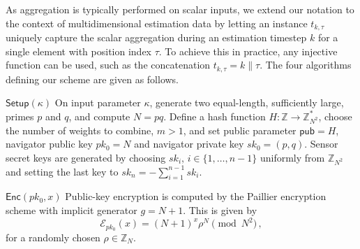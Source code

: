 \documentclass[10pt,letterpaper,oneside,twocolumn,journal]{IEEEtran}
\theoremstyle{definition}
\theoremstyle{definition}
\theoremstyle{remark}
\begin{document}
As aggregation is typically performed on scalar inputs, we extend our notation to the context of multidimensional estimation data by letting an instance $t_{k,\tau}$ uniquely capture the scalar aggregation during an estimation timestep $k$ for a single element with position index $\tau$. To achieve this in practice, any injective function can be used, such as the concatenation $t_{k,\tau}=k\mathbin\|\tau$. The four algorithms defining our scheme are given as follows.
\begin{LaTeXdescription}
    \item[$\mathsf{Setup}(\kappa)$] On input parameter $\kappa$, generate two equal-length, sufficiently large, primes $p$ and $q$, and compute $N=pq$. Define a hash function $H:\mathbb{Z} \rightarrow \mathbb{Z}_{N^2}^*$, choose the number of weights to combine, $m>1$, and set public parameter $\mathsf{pub}=H$, navigator public key $pk_0 = N$ and navigator private key $sk_0=(p,q)$. Sensor secret keys are generated by choosing $sk_i,\,i\in\{1,\dots,n-1\}$ uniformly from $\mathbb{Z}_{N^2}$ and setting the last key to $sk_n = -\sum^{n-1}_{i=1}sk_i$.
 
    \item[$\mathsf{Enc}(pk_0, x)$] Public-key encryption is computed by the Paillier encryption scheme with implicit generator $g=N+1$. This is given by
    \begin{equation}
        \mathcal{E}_{pk_0}(x) = (N+1)^{x}\rho^N \pmod{N^2}\,, \label{eqn:our_scheme_encrypt}
    \end{equation}
    for a randomly chosen $\rho \in \mathbb{Z}_N$.


\end{LaTeXdescription}
\end{document}
